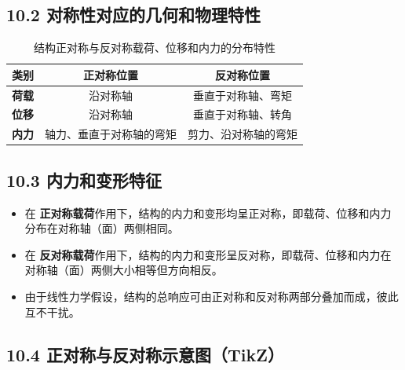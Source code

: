 \documentclass[12pt,a4paper]{article}
\begin{document}
\subsection*{10.2 对称性对应的几何和物理特性}

\begin{table}[h]
\centering
\begin{tabular}{|c|c|c|}
\hline
\textbf{类别} & \textbf{正对称位置} & \textbf{反对称位置} \\ \hline
\textbf{荷载} & 沿对称轴 & 垂直于对称轴、弯矩 \\ \hline
\textbf{位移} & 沿对称轴 & 垂直于对称轴、转角 \\ \hline
\textbf{内力} & 轴力、垂直于对称轴的弯矩 & 剪力、沿对称轴的弯矩 \\ \hline
\end{tabular}
\caption{结构正对称与反对称载荷、位移和内力的分布特性}
\end{table}

\subsection*{10.3 内力和变形特征}

\begin{itemize}
  \item 在 \textbf{正对称载荷}作用下，结构的内力和变形均呈正对称，即载荷、位移和内力分布在对称轴（面）两侧相同。  
  \item 在 \textbf{反对称载荷}作用下，结构的内力和变形呈反对称，即载荷、位移和内力在对称轴（面）两侧大小相等但方向相反。  
  \item 由于线性力学假设，结构的总响应可由正对称和反对称两部分叠加而成，彼此互不干扰。  
\end{itemize}

\subsection*{10.4 正对称与反对称示意图（TikZ）}
\end{document}
